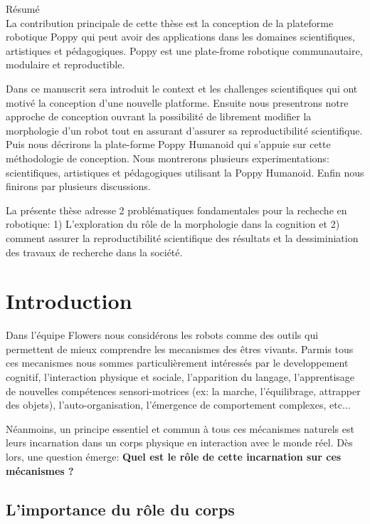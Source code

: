 %

{Résumé}
\label{cha:abstract-diff} \\


La contribution principale de cette thèse est la conception de la plateforme robotique Poppy qui peut avoir des applications dans les domaines scientifiques, artistiques et pédagogiques. Poppy est une plate-frome robotique communautaire, modulaire et reproductible.

Dans ce manuscrit sera introduit le context et les challenges scientifiques qui ont motivé la conception d'une nouvelle platforme. Ensuite nous presentrons notre approche de conception ouvrant la possibilité de librement modifier la morphologie d'un robot tout en assurant d'assurer sa reproductibilité scientifique. Puis nous décrirons la plate-forme Poppy Humanoid qui s'appuie sur cette méthodologie de conception. Nous montrerons plusieurs experimentations: scientifiques, artistiques et pédagogiques utilisant la Poppy Humanoid.
Enfin nous finirons par plusieurs discussions.


La présente thèse adresse 2 problématiques fondamentales pour  la recheche en robotique: 1) L'exploration du rôle de la morphologie dans la cognition et
2) comment assurer la reproductibilité scientifique des résultats et la dessiminiation des travaux de recherche dans la société.


\section*{Introduction}


Dans l'équipe Flowers nous considérons les robots comme des outils qui permettent de mieux comprendre les mecanismes des êtres vivants. Parmis tous ces mecanismes nous sommes particulièrement intéressés par le developpement cognitif, l'interaction physique et sociale, l'apparition du langage, l'apprentisage de nouvelles compétences sensori-motrices (ex: la marche, l'équilibrage, attrapper des objets), l'auto-organisation, l'émergence de comportement complexes, etc...

Néanmoins, un principe essentiel et commun à tous ces mécanismes naturels est leurs incarnation dans un corps physique en interaction avec le monde réel. Dès lors, une question émerge: \textbf{Quel est le rôle de cette incarnation sur ces mécanismes ?}

\subsection*{L'importance du rôle du corps}

